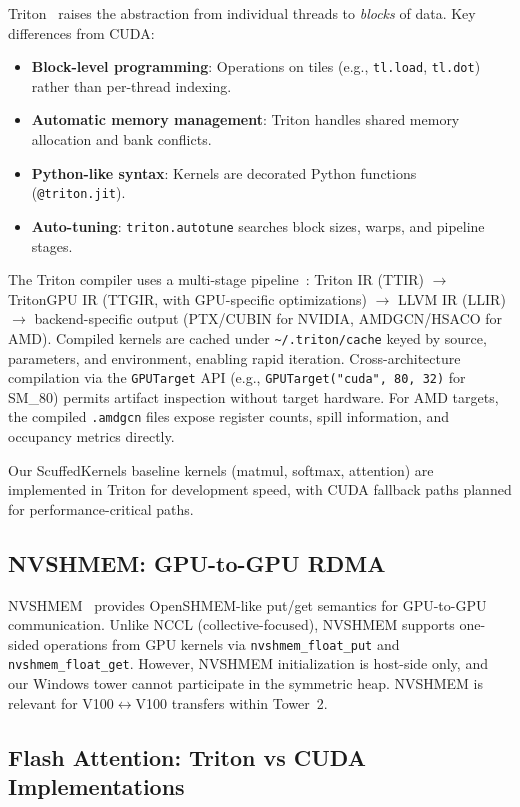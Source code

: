 \documentclass[11pt,letterpaper]{article}
\theoremstyle{definition}
\begin{document}
Triton~\cite{triton2019} raises the abstraction from individual threads to \emph{blocks} of data. Key differences from CUDA:
\begin{itemize}
    \item \textbf{Block-level programming}: Operations on tiles (e.g., \texttt{tl.load}, \texttt{tl.dot}) rather than per-thread indexing.
    \item \textbf{Automatic memory management}: Triton handles shared memory allocation and bank conflicts.
    \item \textbf{Python-like syntax}: Kernels are decorated Python functions (\texttt{@triton.jit}).
    \item \textbf{Auto-tuning}: \texttt{triton.autotune} searches block sizes, warps, and pipeline stages.
\end{itemize}

The Triton compiler uses a multi-stage pipeline~\cite{triton-compiler-tips}: Triton IR (TTIR) $\to$ TritonGPU IR (TTGIR, with GPU-specific optimizations) $\to$ LLVM IR (LLIR) $\to$ backend-specific output (PTX/CUBIN for NVIDIA, AMDGCN/HSACO for AMD). Compiled kernels are cached under \texttt{\~{}/.triton/cache} keyed by source, parameters, and environment, enabling rapid iteration. Cross-architecture compilation via the \texttt{GPUTarget} API (e.g., \texttt{GPUTarget("cuda", 80, 32)} for SM\_80) permits artifact inspection without target hardware. For AMD targets, the compiled \texttt{.amdgcn} files expose register counts, spill information, and occupancy metrics directly.

Our ScuffedKernels baseline kernels (matmul, softmax, attention) are implemented in Triton for development speed, with CUDA fallback paths planned for performance-critical paths.

\subsection{NVSHMEM: GPU-to-GPU RDMA}

NVSHMEM~\cite{nvshmem} provides OpenSHMEM-like put/get semantics for GPU-to-GPU communication. Unlike NCCL (collective-focused), NVSHMEM supports one-sided operations from GPU kernels via \texttt{nvshmem\_float\_put} and \texttt{nvshmem\_float\_get}. However, NVSHMEM initialization is host-side only, and our Windows tower cannot participate in the symmetric heap. NVSHMEM is relevant for V100$\leftrightarrow$V100 transfers within Tower~2.

\subsection{Flash Attention: Triton vs CUDA Implementations}
\end{document}
